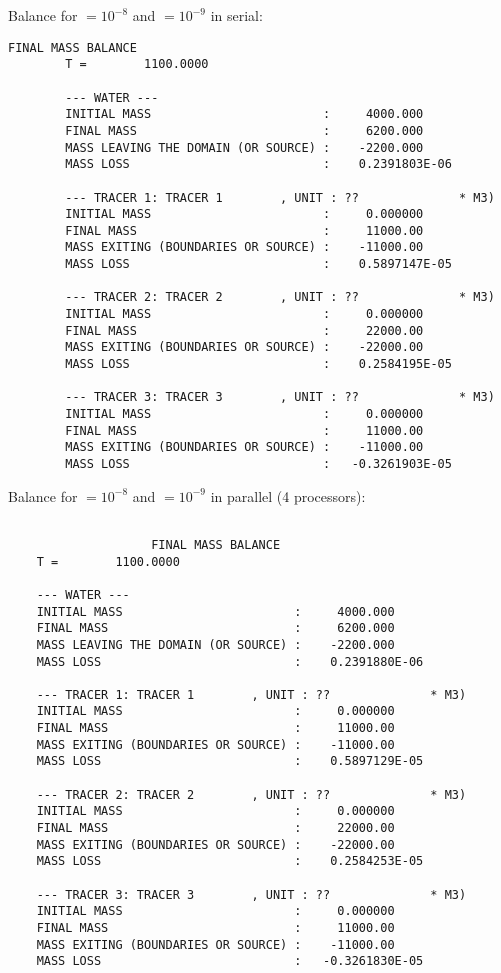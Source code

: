 \bigskip
Balance for  $= 10^{-8}$ and
 $= 10^{-9}$ in serial:
%
\begin{lstlisting}[language=TelFortran]
                        FINAL MASS BALANCE
        T =        1100.0000

        --- WATER ---
        INITIAL MASS                        :     4000.000
        FINAL MASS                          :     6200.000
        MASS LEAVING THE DOMAIN (OR SOURCE) :    -2200.000
        MASS LOSS                           :    0.2391803E-06

        --- TRACER 1: TRACER 1        , UNIT : ??              * M3)
        INITIAL MASS                        :     0.000000
        FINAL MASS                          :     11000.00
        MASS EXITING (BOUNDARIES OR SOURCE) :    -11000.00
        MASS LOSS                           :    0.5897147E-05

        --- TRACER 2: TRACER 2        , UNIT : ??              * M3)
        INITIAL MASS                        :     0.000000
        FINAL MASS                          :     22000.00
        MASS EXITING (BOUNDARIES OR SOURCE) :    -22000.00
        MASS LOSS                           :    0.2584195E-05

        --- TRACER 3: TRACER 3        , UNIT : ??              * M3)
        INITIAL MASS                        :     0.000000
        FINAL MASS                          :     11000.00
        MASS EXITING (BOUNDARIES OR SOURCE) :    -11000.00
        MASS LOSS                           :   -0.3261903E-05
\end{lstlisting}

\bigskip
Balance for  $= 10^{-8}$ and
 $= 10^{-9}$ in parallel
(4 processors):
%
\begin{lstlisting}[language=TelFortran]

	                FINAL MASS BALANCE
	T =        1100.0000

	--- WATER ---
	INITIAL MASS                        :     4000.000
	FINAL MASS                          :     6200.000
	MASS LEAVING THE DOMAIN (OR SOURCE) :    -2200.000
	MASS LOSS                           :    0.2391880E-06

	--- TRACER 1: TRACER 1        , UNIT : ??              * M3)
	INITIAL MASS                        :     0.000000
	FINAL MASS                          :     11000.00
	MASS EXITING (BOUNDARIES OR SOURCE) :    -11000.00
	MASS LOSS                           :    0.5897129E-05

	--- TRACER 2: TRACER 2        , UNIT : ??              * M3)
	INITIAL MASS                        :     0.000000
	FINAL MASS                          :     22000.00
	MASS EXITING (BOUNDARIES OR SOURCE) :    -22000.00
	MASS LOSS                           :    0.2584253E-05

	--- TRACER 3: TRACER 3        , UNIT : ??              * M3)
	INITIAL MASS                        :     0.000000
	FINAL MASS                          :     11000.00
	MASS EXITING (BOUNDARIES OR SOURCE) :    -11000.00
	MASS LOSS                           :   -0.3261830E-05
\end{lstlisting}

